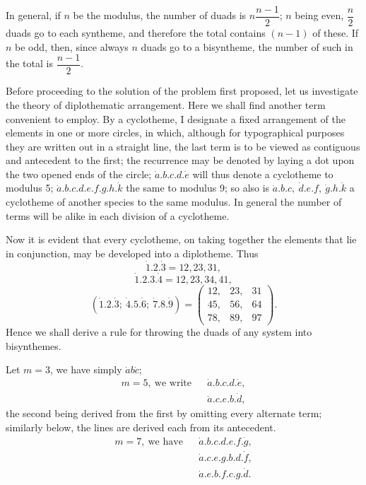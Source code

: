 \documentclass[11pt]{article}
\newcommand{\sourcepage}[1]{\marginpar{\scriptsize p.~#1}}
\newcommand{\dotter}[1]{\dot{#1}}
\begin{document}
{{\sourcepage{93}
In general, if $n$ be the modulus, the number of duads is $n\dfrac{n-1}{2}$; $n$ being even, $\dfrac{n}{2}$ duads go to each syntheme, and therefore the total contains $(n-1)$ of these. If $n$ be odd, then, since always $n$ duads go to a bisyntheme, the number of such in the total is $\dfrac{n-1}{2}$.

Before proceeding to the solution of the problem first proposed, let us investigate the theory of diplothematic arrangement. Here we shall find another term convenient to employ. By a cyclotheme, I designate a fixed arrangement of the elements in one or more circles, in which, although for typographical purposes they are written out in a straight line, the last term is to be viewed as contiguous and antecedent to the first; the recurrence may be denoted by laying a dot upon the two opened ends of the circle; $\dotter a.b.c.d.\dotter e$ will thus denote a cyclotheme to modulus 5; $\dotter a.b.c.d.e.f.g.h.\dotter k$ the same to modulus 9; so also is $\dotter a.b.c,\ \dotter d.e.f,\ \dotter g.h.\dotter k$ a cyclotheme of another species to the same modulus. In general the number of terms will be alike in each division of a cyclotheme.

Now it is evident that every cyclotheme, on taking together the elements that lie in conjunction, may be developed into a diplotheme. Thus
\[
\dotter1.2.\dotter3 = 12,23,31,
\]
\[
\dotter1.2.3.\dotter4 = 12,23,34,41,
\]
\[
(\dotter1.2.\dotter3;\ \dotter4.5.\dotter6;\ \dotter7.8.\dotter9)
=
\left(\begin{array}{lll}
12,&23,&31\\
45,&56,&64\\
78,&89,&97
\end{array}\right).
\]
Hence we shall derive a rule for throwing the duads of any system into bisynthemes.

Let $m=3$, we have simply $\dotter a b\dotter c$;
\[
\begin{array}{rcl}
m=5,\ \text{we write}&& \dotter a.b.c.d.\dotter e,\\
&& \dotter a.c.e.b.\dotter d,
\end{array}
\]
the second being derived from the first by omitting every alternate term; similarly below, the lines are derived each from its antecedent.
\[
\begin{array}{rcl}
m=7,\ \text{we have}&& \dotter a.b.c.d.e.f.\dotter g,\\
&& \dotter a.c.e.g.b.d.\dotter f,\\
&& \dotter a.e.b.f.c.g.\dotter d.
\end{array}
\]

}}
\end{document}
